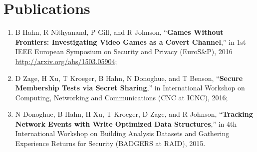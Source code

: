 \documentclass[11pt,a4paper,sans]{moderncv}        %
\begin{document}
\section{Publications}
\begin{enumerate}
	\item  B Hahn, R Nithyanand, P Gill, and R Johnson, “\textbf{Games Without Frontiers: Investigating Video Games as a Covert Channel},” in 1st IEEE European Symposium on Security and Privacy (EuroS\&P), 2016 \\ \url{http://arxiv.org/abs/1503.05904};
	\item D Zage, H Xu, T Kroeger, B Hahn, N Donoghue, and T Benson, “\textbf{Secure Membership Tests via Secret Sharing},” in International Workshop on Computing, Networking and Communications (CNC at ICNC), 2016;
	\item N Donoghue, B Hahn, H Xu, T Kroeger, D Zage, and R Johnson, “\textbf{Tracking Network Events with Write Optimized Data Structures},” in 4th International Workshop on Building Analysis Datasets and Gathering Experience Returns for Security (BADGERS at RAID), 2015.
\end{enumerate}
\end{document}
